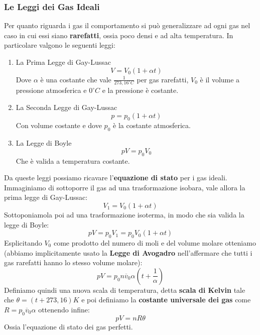 \documentclass{article}
\begin{document}
\subsubsection{Le Leggi dei Gas Ideali}
Per quanto riguarda i gas il comportamento si può generalizzare ad ogni gas nel caso in cui essi siano \textbf{rarefatti}, ossia poco densi e ad alta temperatura. In particolare valgono le seguenti leggi:
\begin{enumerate}
    \item La Prima Legge di Gay-Lussac \[V=V_0(1+\alpha t)\]
    Dove $\alpha$ è una costante che vale $\frac{1}{273,16^\circ C}$ per gas rarefatti, $V_0$ è il volume a pressione atmosferica e $0^\circ C$ e la pressione è costante.
    \item La Seconda Legge di Gay-Lussac \[p=p_0(1+\alpha t)\]
    Con volume costante e dove $p_0$ è la costante atmosferica.
    \item La Legge di Boyle \[pV=p_0V_0\]
    Che è valida a temperatura costante.
\end{enumerate}
Da queste leggi possiamo ricavare l'\textbf{equazione di stato} per i gas ideali. Immaginiamo di sottoporre il gas ad una trasformazione isobara, vale allora la prima legge di Gay-Lussac:
\[V_1=V_0(1+\alpha t)\]
Sottoponiamola poi ad una trasformazione isoterma, in modo che sia valida la legge di Boyle:
\[pV=p_0V_1=p_0V_0(1+\alpha t)\]
Esplicitando $V_0$ come prodotto del numero di moli e del volume molare otteniamo (abbiamo implicitamente usato la \textbf{Legge di Avogadro} nell'affermare che tutti i gas rarefatti hanno lo stesso volume molare):
\[pV=p_0n\overline{v}_0\alpha \left(t+\frac{1}{\alpha}\right)\]
Definiamo quindi una nuova scala di temperatura, detta \textbf{scala di Kelvin} tale che $\theta=(t+273,16)K$ e poi definiamo la \textbf{costante universale dei gas} come $R=p_0\overline{v}_0\alpha$ ottenendo infine:
\begin{equation}
\boxed{pV=nR\theta}
\end{equation}
Ossia l'equazione di stato dei gas perfetti.
\end{document}
